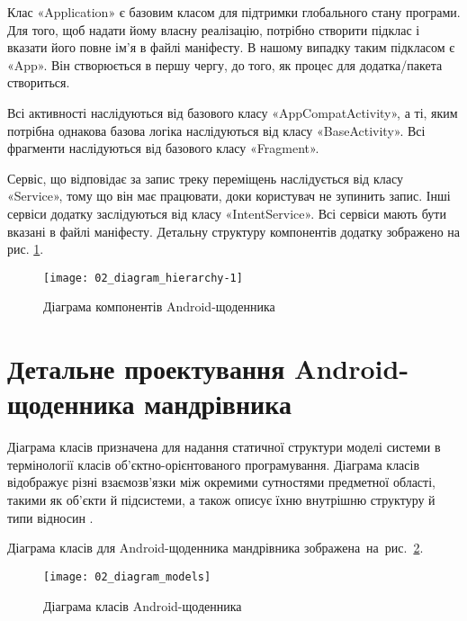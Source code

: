 \documentclass[../main.tex]{subfiles}
\begin{document}
Клас «Application» є базовим класом для підтримки глобального стану програми. Для того, щоб надати йому власну реалізацію, потрібно створити підклас і вказати його повне ім'я в файлі маніфесту. В нашому випадку таким підкласом є «App». Він створюється в першу чергу, до того, як процес для додатка/пакета створиться.

Всі активності наслідуються від базового класу «AppCompatActivity», а ті, яким потрібна однакова базова логіка наслідуються від класу «BaseActivity». Всі фрагменти наслідуються від базового класу «Fragment».

Сервіс, що відповідає за запис треку переміщень наслідується від класу «Service», тому що він має працювати, доки користувач не зупинить запис. Інші сервіси додатку заслідуються від класу «IntentService». Всі сервіси мають бути вказані в файлі маніфесту. Детальну структуру компонентів додатку зображено на рис. \ref{diagram:hierarchy}.

\begin{figure}[H]
	\centering
	\texttt{[image: 02\_diagram\_hierarchy-1]}
	\caption{Діаграма компонентів Android-щоденника}
	\label{diagram:hierarchy}
\end{figure}

\section{Детальне проектування Android-щоденника мандрівника}

Діаграма класів призначена для надання статичної структури моделі системи в термінології класів об’єктно-орієнтованого програмування. Діаграма класів відображує різні взаємозв’язки між окремими сутностями предметної області, такими як об’єкти й підсистеми, а також описує їхню внутрішню структуру й типи відносин \cite{diploma_guidelines}. 

Діаграма класів для Android-щоденника мандрівника зображена~на~рис.~\ref{diagram:models}.

\begin{figure}[H]
	\centering
	\texttt{[image: 02\_diagram\_models]}
	\caption{Діаграма класів Android-щоденника}
	\label{diagram:models}
\end{figure}
\end{document}
